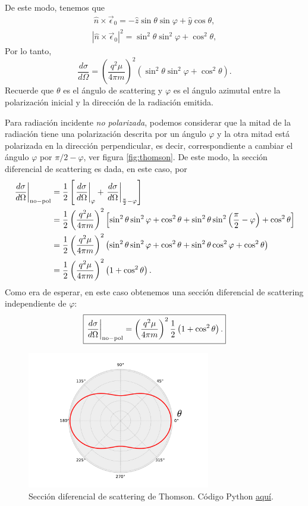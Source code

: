 De este modo, tenemos que
\begin{align}
\hat{n}\times\vec{\epsilon}_0 = -\hat{z}\sin\theta\sin\varphi +\hat{y}\cos\theta,
\end{align}
\begin{align}
\left|\hat{n}\times\vec{\epsilon}_0\right|^2 = \sin^2\theta\sin^2\varphi +\cos^2\theta,
\end{align}
Por lo tanto,
\begin{equation}
\frac{d\sigma}{d\Omega}=\left(\frac{q^2\mu}{4\pi m}\right)^2
\left( \sin^2\theta\sin^2\varphi +\cos^2\theta \right).
\end{equation}
Recuerde que $\theta$ es el ángulo de scattering y $\varphi$ es el ángulo
azimutal entre la polarización inicial y la dirección de la radiación
emitida.

Para radiación incidente \textit{no polarizada}, podemos considerar que la
mitad de la radiación tiene una polarización descrita por un ángulo $\varphi$
y la otra mitad está polarizada en la dirección perpendicular, es decir,
correspondiente a cambiar el ángulo $\varphi$ por ${\pi}/{2}-\varphi$, ver figura  \ref{fig:thomson}. De este modo, la sección diferencial de scattering es dada, en este caso, por
\begin{align}
\left. \frac{d\sigma}{d\Omega}\right|_{\rm no-pol}&=\frac{1}{2}\left[\left.
\frac{d\sigma}{d\Omega}\right|_\varphi+\left.
\frac{d\sigma}{d\Omega}\right|_{\frac{\pi}{2}-\varphi}\right] \\
&=\frac{1}{2}\left(\frac{q^2\mu}{4\pi m}\right)^2\left[\sin^2\theta\sin^2\varphi +\cos^2\theta +\sin^2\theta\sin^2\left(\frac{\pi}{2}-\varphi\right) +\cos^2\theta\right]\\
&=\frac{1}{2}\left(\frac{q^2\mu}{4\pi m}\right)^2\left(\sin^2\theta\sin^2\varphi +\cos^2\theta +\sin^2\theta\cos^2\varphi +\cos^2\theta\right)\\
&=\frac{1}{2}\left(\frac{q^2\mu}{4\pi m}\right)^2\left(1+\cos^2\theta\right).
\end{align}
Como era de esperar, en este caso obtenemos una sección diferencial de scattering independiente de $\varphi$:
\begin{equation}
\boxed{\left.\frac{d\sigma}{d\Omega}\right|_{\rm no-pol}=\left(\frac{q^2\mu}{4\pi m}\right)^2\frac{1}
{2}\left(1+\cos^2\theta\right) .}
\end{equation}
\begin{figure}[H]
\centerline{\includegraphics[height=6cm]{fig/fig-Thomson.pdf}}
 \caption{Sección diferencial de scattering de Thomson. Código Python \href{https://github.com/gfrubi/electrodinamica/blob/master/figuras-editables/fig-Thomson.py}{aquí}.}
\label{fig:thomson_2d}
\end{figure}
